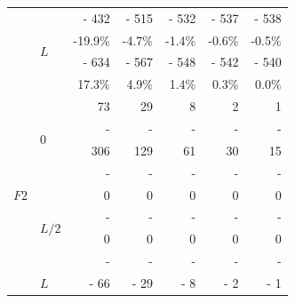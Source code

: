 \begin{figure}[p]
\begin{fullpage}
\begin{tabularx}{0.6\textwidth}{@{} XX rrrrr@{}}
&\multirow{4}{*}{$L$}&{\color{Tblue}\normalsize- 432}&{\color{Tblue}\normalsize- 515}&{\color{Tblue}\normalsize- 532}&{\color{Tblue}\normalsize- 537}&{\color{Tblue}\normalsize- 538}\\
&&{\color{Tblue}\scriptsize-19.9\%}&{\color{Tblue}\scriptsize-4.7\%}&{\color{Tblue}\scriptsize-1.4\%}&{\color{Tblue}\scriptsize-0.6\%}&{\color{Tblue}\scriptsize-0.5\%}\\
&&{\color{black}\normalsize- 634}&{\color{black}\normalsize- 567}&{\color{black}\normalsize- 548}&{\color{black}\normalsize- 542}&{\color{black}\normalsize- 540}\\
&&{\color{black}\scriptsize17.3\%}&{\color{black}\scriptsize4.9\%}&{\color{black}\scriptsize1.4\%}&{\color{black}\scriptsize0.3\%}&{\color{black}\scriptsize0.0\%}\\\midrule
\multirow{12}{*}{$F2$}&\multirow{4}{*}{$0$}&{\color{Tblue}\normalsize 73}&{\color{Tblue}\normalsize 29}&{\color{Tblue}\normalsize 8}&{\color{Tblue}\normalsize 2}&{\color{Tblue}\normalsize 1}\\
&&{\color{Tblue}\scriptsize-}&{\color{Tblue}\scriptsize-}&{\color{Tblue}\scriptsize-}&{\color{Tblue}\scriptsize-}&{\color{Tblue}\scriptsize-}\\
&&{\color{black}\normalsize 306}&{\color{black}\normalsize 129}&{\color{black}\normalsize 61}&{\color{black}\normalsize 30}&{\color{black}\normalsize 15}\\
&&{\color{black}\scriptsize-}&{\color{black}\scriptsize-}&{\color{black}\scriptsize-}&{\color{black}\scriptsize-}&{\color{black}\scriptsize-}\\\cmidrule[0.5\cmidrulewidth]{2-7}
&\multirow{4}{*}{$L/2$}&{\color{Tblue}\normalsize 0}&{\color{Tblue}\normalsize 0}&{\color{Tblue}\normalsize 0}&{\color{Tblue}\normalsize 0}&{\color{Tblue}\normalsize 0}\\
&&{\color{Tblue}\scriptsize-}&{\color{Tblue}\scriptsize-}&{\color{Tblue}\scriptsize-}&{\color{Tblue}\scriptsize-}&{\color{Tblue}\scriptsize-}\\
&&{\color{black}\normalsize 0}&{\color{black}\normalsize 0}&{\color{black}\normalsize 0}&{\color{black}\normalsize 0}&{\color{black}\normalsize 0}\\
&&{\color{black}\scriptsize-}&{\color{black}\scriptsize-}&{\color{black}\scriptsize-}&{\color{black}\scriptsize-}&{\color{black}\scriptsize-}\\\cmidrule[0.5\cmidrulewidth]{2-7}
&\multirow{4}{*}{$L$}&{\color{Tblue}\normalsize- 66}&{\color{Tblue}\normalsize- 29}&{\color{Tblue}\normalsize- 8}&{\color{Tblue}\normalsize- 2}&{\color{Tblue}\normalsize- 1}\\

\end{tabularx}
\end{fullpage}
\end{figure}
